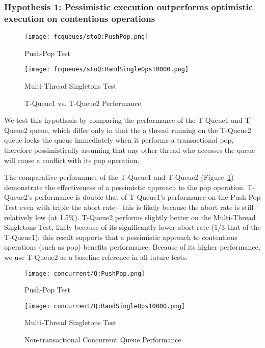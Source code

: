 \subsubsection{Hypothesis 1: Pessimistic execution outperforms optimistic execution on contentious operations}
\begin{figure}[t]
    \centering
	\begin{minipage}{0.45\textwidth}
	    \texttt{[image: fcqueues/stoQ:PushPop.png]}
        \caption*{Push-Pop Test}
	\end{minipage}
	\begin{minipage}{0.45\textwidth}
	    \texttt{[image: fcqueues/stoQ:RandSingleOps10000.png]}
        \caption*{Multi-Thread Singletons Test}
	\end{minipage}
    \caption{T-Queue1 vs. T-Queue2 Performance}
    \label{fig:stoqs}
\end{figure}


We test this hypothesis by comparing the performance of the T-Queue1 and T-Queue2 queue, which differ only in that the a thread running on the T-Queue2 queue locks the queue immediately when it performs a transactional pop, therefore pessimistically assuming that any other thread who accesses the queue will cause a conflict with its pop operation.

The comparative performance of the T-Queue1 and T-Queue2 (Figure~\ref{fig:stoqs}) demonstrate the effectiveness of a pessimistic approach to the pop operation. T-Queue2's performance is double that of T-Queue1's performance on the Push-Pop Test even with triple the abort rate---this is likely because the abort rate is still relatively low (at 1.5\%). T-Queue2 performs slightly better on the Multi-Thread Singletons Test, likely because of its significantly lower abort rate (1/3 that of the T-Queue1): this result supports that a pessimistic approach to contentious operations (such as pop) benefits performance. Because of its higher performance, we use T-Queue2 as a baseline reference in all future tests.

\vspace{12pt}
\noindent{}

\begin{figure}[t]
    \centering
	\begin{minipage}{0.45\textwidth}
	    \texttt{[image: concurrent/Q:PushPop.png]}
        \caption*{Push-Pop Test}
	\end{minipage}
   	\begin{minipage}{0.45\textwidth}
	    \texttt{[image: concurrent/Q:RandSingleOps10000.png]}
        \caption*{Multi-Thread Singletons Test}
	\end{minipage}
        \caption{Non-transactional Concurrent Queue Performance}
    \label{fig:ntqs}
\end{figure}

